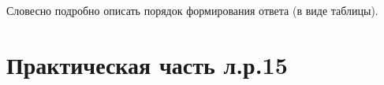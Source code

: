 \documentclass[a4paper,oneside,12pt]{extreport}
\begin{document}
\newpage

\begin{task}
    Словесно подробно описать порядок формирования ответа (в виде таблицы).

    \begin{figure}[ht!]
    \end{figure}


\end{task}

\newpage

\section*{Практическая часть л.р.15}
\end{document}
